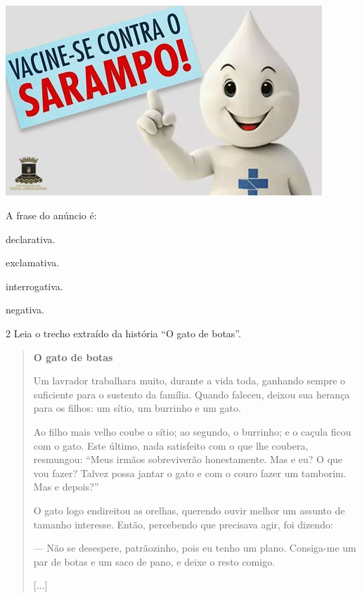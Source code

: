 \includegraphics[width=4.68681in,height=2.81736in]{./media/image7.jpeg}

A frase do anúncio é:

\begin{escolha}[itemsep=-5pt]
\item
  declarativa.
\item
  exclamativa.
\item
  interrogativa.
\item
  negativa.
\end{escolha}

\num{2} Leia o trecho extraído da história ``O gato de botas''.

\begin{quote}
\textbf{O gato de botas}

Um lavrador trabalhara muito, durante a vida toda, ganhando sempre o
suficiente para o sustento da família. Quando faleceu, deixou sua
herança para os filhos: um sítio, um burrinho e um gato.

Ao filho mais velho coube o sítio; ao segundo, o burrinho; e o caçula
ficou com o gato. Este último, nada satisfeito com o que lhe coubera,
resmungou: ``Meus irmãos sobreviverão honestamente. Mas e eu? O que vou
fazer? Talvez possa jantar o gato e com o couro fazer um tamborim. Mas e
depois?''

O gato logo endireitou as orelhas, querendo ouvir melhor um assunto de
tamanho interesse. Então, percebendo que precisava agir, foi dizendo:

--- Não se desespere, patrãozinho, pois eu tenho um plano. Consiga-me um
par de botas e um saco de pano, e deixe o resto comigo.

{[}...{]}

\end{quote}

